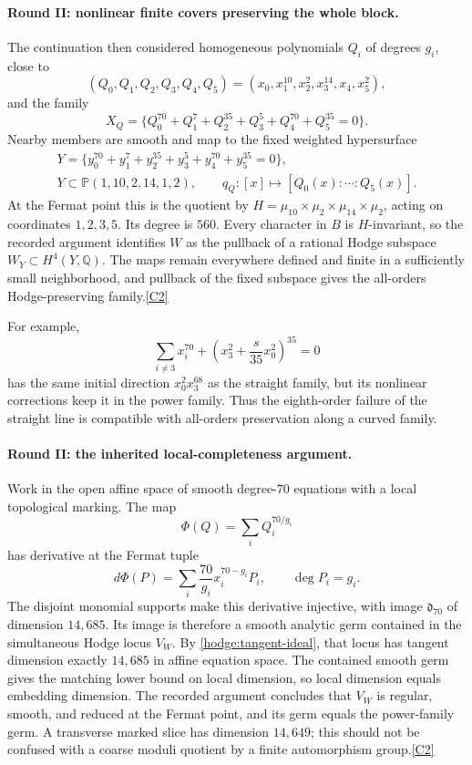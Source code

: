 \documentclass[11pt]{article}
\newcommand{\Q}{\mathbb Q}
\newcommand{\src}[1]{\hyperlink{src:#1}{[#1]}}
\begin{document}
\paragraph{Round II: nonlinear finite covers preserving the whole block.}
The continuation then considered homogeneous polynomials $Q_i$ of degrees
$g_i$, close to
\[
 (Q_0,Q_1,Q_2,Q_3,Q_4,Q_5)
 =(x_0,x_1^{10},x_2^2,x_3^{14},x_4,x_5^2),
\]
and the family
\begin{equation}\label{hodge:power-family}
 X_Q=\{Q_0^{70}+Q_1^7+Q_2^{35}+Q_3^5+Q_4^{70}+Q_5^{35}=0\}.
\end{equation}
Nearby members are smooth and map to the fixed weighted hypersurface
\begin{equation}\label{hodge:weighted}
 \begin{gathered}
 Y=\{y_0^{70}+y_1^7+y_2^{35}+y_3^5+y_4^{70}+y_5^{35}=0\},\\
 Y\subset\mathbb P(1,10,2,14,1,2),\qquad
 q_Q:[x]\longmapsto[Q_0(x):\cdots:Q_5(x)].
 \end{gathered}
\end{equation}
At the Fermat point this is the quotient by
$H=\mu_{10}\times\mu_2\times\mu_{14}\times\mu_2$, acting on coordinates
$1,2,3,5$. Its degree is $560$. Every character in $B$ is $H$-invariant,
so the recorded argument identifies $W$ as the pullback of a rational Hodge
subspace $W_Y\subset H^4(Y,\Q)$. The maps remain everywhere defined and
finite in a sufficiently small neighborhood, and pullback of the fixed
subspace gives the all-orders Hodge-preserving family.\src{C2}

For example,
\begin{equation}\label{hodge:curved-example}
 \sum_{i\ne3}x_i^{70}
 +\left(x_3^2+\frac{s}{35}x_0^2\right)^{35}=0
\end{equation}
has the same initial direction $x_0^2x_3^{68}$ as the straight family, but
its nonlinear corrections keep it in the power family. Thus the eighth-order
failure of the straight line is compatible with all-orders preservation
along a curved family.

\paragraph{Round II: the inherited local-completeness argument.}
Work in the open affine space of smooth degree-$70$ equations with a local
topological marking. The map
\[
 \Phi(Q)=\sum_i Q_i^{70/g_i}
\]
has derivative at the Fermat tuple
\[
 d\Phi(P)=\sum_i\frac{70}{g_i}x_i^{70-g_i}P_i,
 \qquad \deg P_i=g_i.
\]
The disjoint monomial supports make this derivative injective, with image
$\mathfrak d_{70}$ of dimension $14,685$. Its image is therefore a smooth
analytic germ contained in the simultaneous Hodge locus $V_W$. By
\eqref{hodge:tangent-ideal}, that locus has tangent dimension exactly
$14,685$ in affine equation space. The contained smooth germ gives the
matching lower bound on local dimension, so local dimension equals embedding
dimension. The recorded argument concludes that $V_W$ is regular, smooth,
and reduced at the Fermat point, and its germ equals the power-family germ.
A transverse marked slice has dimension $14,649$; this should not be confused
with a coarse moduli quotient by a finite automorphism group.\src{C2}
\end{document}
